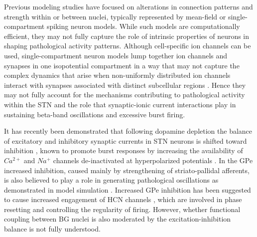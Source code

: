 %
Previous modeling studies have focused on alterations in connection patterns and strength within or between nuclei, typically represented by mean-field or single-compartment spiking neuron models. While such models are computationally efficient, they may not fully capture the role of intrinsic properties of neurons in shaping pathological activity patterns. Although cell-specific ion channels can be used, single-compartment neuron models lump together ion channels and synapses in one isopotential compartment in a way that may not capture the complex dynamics that arise when non-uniformly distributed ion channels \cite{gillies_membrane_2005} interact with synapses associated with distinct subcellular regions \cite{pan_neuronal_2016,galvan_differential_2004,bevan_glutamate-enriched_1995}. Hence they may not fully account for the mechanisms contributing to pathological activity within the STN and the role that synaptic-ionic current interactions play in sustaining beta-band oscillations and excessive burst firing.
%
%

%
It has recently been demonstrated that following dopamine depletion the balance of excitatory and inhibitory synaptic currents in STN neurons is shifted toward inhibition \cite{chu_loss_2017,wang_impaired_2018}, known to promote burst responses by increasing the availability of $Ca^{2+}$ and $Na^{+}$ channels de-inactivated at hyperpolarized potentials \cite{baufreton_enhancement_2005}. In the GPe increased inhibition, caused mainly by strengthening of striato-pallidal afferents, is also believed to play a role in generating pathological oscillations as demonstrated in model simulation \cite{terman_activity_2002,gillies_subthalamic-pallidal_2002,kumar_role_2011,holgado_conditions_2010}. Increased GPe inhibition has been suggested to cause increased engagement of HCN channels \cite{chan_hcn2_2004}, which are involved in phase resetting and controlling the regularity of firing. However, whether functional coupling between BG nuclei is also moderated by the excitation-inhibition balance is not fully understood.
%
%

